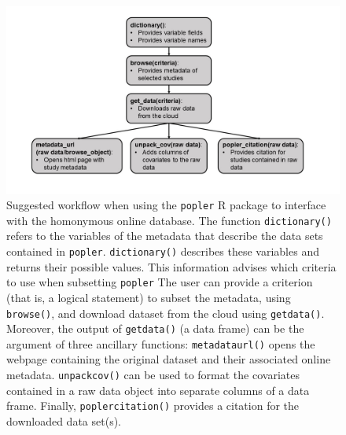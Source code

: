 \documentclass{article}\usepackage[]{graphicx}\usepackage[]{color}
\begin{document}
\newpage
\begin{figure}[h!]
  \begin{center}
    \includegraphics[scale=0.4]{pack_funs}
    \caption{Suggested workflow when using the \texttt{popler} R package to interface with the homonymous online database. The function \texttt{dictionary()} refers to the variables of the metadata that describe the data sets contained in \texttt{popler}. \texttt{dictionary()} describes these variables and returns their possible values. This information advises which criteria to use when subsetting \texttt{popler} The user can provide a criterion (that is, a logical statement) to subset the metadata, using \texttt{browse()}, and download dataset from the cloud using \texttt{get\textunderscore data()}. Moreover, the output of \texttt{get\textunderscore data()} (a data frame) can be the argument of three ancillary functions: \texttt{metadata\textunderscore url()} opens the webpage containing the original dataset and their associated online metadata. \texttt{unpack\textunderscore cov()} can be used to format the covariates contained in a raw data object into separate columns of a data frame. Finally, \texttt{popler\textunderscore citation()} provides a citation for the downloaded data set(s).}
    \label{Fig:pack_funs}
  \end{center}
\end{figure}
\end{document}
